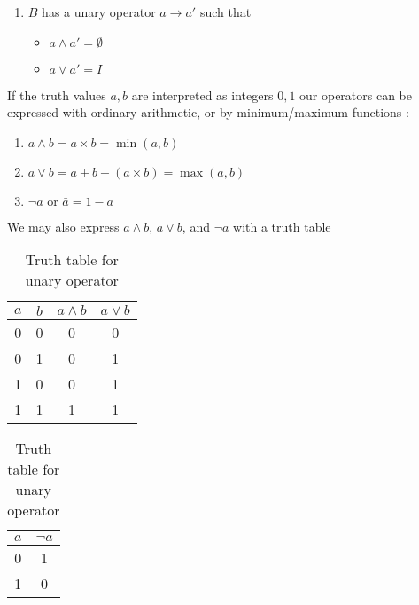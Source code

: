 \documentclass{article}
\begin{document}
\begin{enumerate}
	      (universal set)
	      \begin{itemize}
	      	\item $\emptyset \wedge a = \emptyset$
	      	\item $\emptyset \vee a = a$
	      	\item $I \wedge a = a$
	      	\item $I \vee a = I$
	      \end{itemize}
	\item $B$ has a unary operator $a\rightarrow a'$ such that
	      \begin{itemize}
	      	\item $a \wedge a' = \emptyset$
	      	\item $a \vee a' = I$
	      \end{itemize}
\end{enumerate}
If the truth values $a, b$ are interpreted as integers $0, 1$ our operators can
be expressed with ordinary arithmetic, or by minimum/maximum functions
\cite{algebrainterp}:

\begin{enumerate}
	\item $a \wedge b = a \times b = \min(a,b)$
	\item $a \vee b = a + b - (a \times b) = \max(a,b)$
	\item $\neg a\text{ or }\bar{a} = 1 - a$
\end{enumerate}
We may also express $a \wedge b$, $a \vee b$, and $\neg a$ with a truth table

\begin{table}
	\parbox{.45\linewidth}{
		\centering
		\begin{tabular}{@{}c c c c @{}}
			\toprule
			$a$ & $b$ & $a \wedge b$ & $a \vee b$ \\ \toprule
			0   & 0   & 0            & 0          \\ \midrule
			0   & 1   & 0            & 1          \\ \midrule
			1   & 0   & 0            & 1          \\ \midrule
			1   & 1   & 1            & 1          \\ \bottomrule
		\end{tabular}
		\caption{Truth table for binary operators}
	}
	\hfill
	\parbox{.45\linewidth}{
		\centering
		\begin{tabular}{@{} c c @{}}
			\toprule
			$a$ & $\neg a$ \\ \toprule
			0   & 1        \\ \midrule
			1   & 0        \\ \bottomrule
		\end{tabular}
		\caption{Truth table for unary operator }
	}
\end{table}
\end{document}
